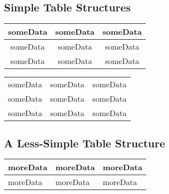 \documentclass[12pt,twoside,a4paper]{article}
\begin{document}
\subsection*{Simple Table Structures}

\begin{tabular}{ c |c| c }
 someData & someData & someData \\
 \hline
 someData & someData & someData \\
 someData & someData & someData
\end{tabular}

\begin{tabular}{ |c|c|c| }
\hline
 someData & someData & someData \\
 someData & someData & someData \\
 someData & someData & someData \\
\hline
\end{tabular}

\subsection*{A Less-Simple Table Structure}
\begin{tabularx}{0.8\textwidth} {
  | >{\raggedright\arraybackslash}X
  | >{\centering\arraybackslash}X
  | >{\raggedleft\arraybackslash}X | }
 \hline
 moreData & moreData & moreData \\
 \hline
 moreData & moreData & moreData \\
\hline
\end{tabularx}
\end{document}
